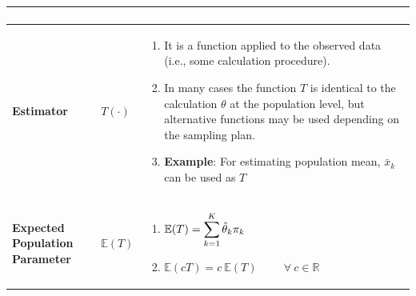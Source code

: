 \begin{customArrayStretch}{1.3}
\begin{longtable}{>{\RaggedRight\arraybackslash}p{4cm} >{\centering\arraybackslash}p{0.5cm} p{10.5cm}}
\begin{minipage}{10.3cm}
\begin{enumerate}
        \end{enumerate}
        \vspace{0.15cm}
    \end{minipage} 
    \\ \hline

\textbf{Estimator} &
    $T(\cdot)$ &
    \begin{minipage}{10.3cm}
        \vspace{0.15cm}
        \begin{enumerate}
            \item It is a function applied to the observed data (i.e., some calculation procedure). 
            \hfill \cite{statistics/book/Statistics-for-Data-Scientists/Maurits-Kaptein}

            \item In many cases the function $T$ is identical to the calculation $\theta$ at the population level, but alternative functions may be used depending on the sampling plan.
            \hfill \cite{statistics/book/Statistics-for-Data-Scientists/Maurits-Kaptein}

            \item \textbf{Example}: For estimating population mean, $\bar{x}_k$ can be used as $T$ 
            \hfill \cite{statistics/book/Statistics-for-Data-Scientists/Maurits-Kaptein}
        \end{enumerate}
        \vspace{0.15cm}
    \end{minipage} 
    \\ \hline

\textbf{Expected Population Parameter} &
    $\mathbb{E}(T)$ &
    \begin{minipage}{10.3cm}
        \vspace{0.15cm}
        \begin{enumerate}
            \item $
                \mathbb{E}(T)
                = \displaystyle\sum_{k=1}^{K} \hat{\theta}_k \pi_k
            $
            \hfill \cite{statistics/book/Statistics-for-Data-Scientists/Maurits-Kaptein}

            \item $
                \mathbb{E}(cT) = c\ \mathbb{E}(T)
                \hspace{1cm} \forall\  c \in \mathbb{R}
            $
            \hfill \cite{statistics/book/Statistics-for-Data-Scientists/Maurits-Kaptein}

        \end{enumerate}
        \vspace{0.15cm}
    \end{minipage} 
    \\ \hline



\end{longtable}
\end{customArrayStretch}

